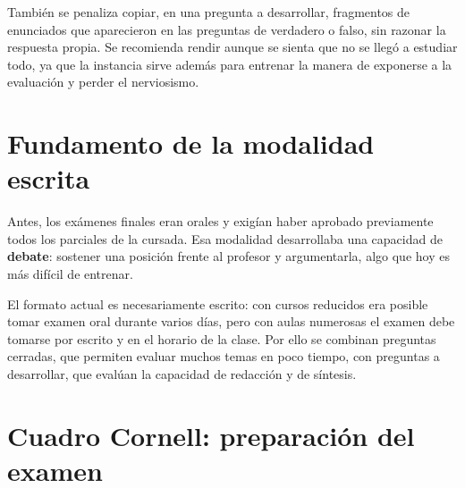 \documentclass[12pt,oneside]{book}
\begin{document}
También se penaliza copiar, en una pregunta a desarrollar, fragmentos de enunciados que aparecieron en las preguntas de verdadero o falso, sin razonar la respuesta propia. Se recomienda rendir aunque se sienta que no se llegó a estudiar todo, ya que la instancia sirve además para entrenar la manera de exponerse a la evaluación y perder el nerviosismo.

\section{Fundamento de la modalidad escrita}

Antes, los exámenes finales eran orales y exigían haber aprobado previamente todos los parciales de la cursada. Esa modalidad desarrollaba una capacidad de \textbf{debate}: sostener una posición frente al profesor y argumentarla, algo que hoy es más difícil de entrenar.

El formato actual es necesariamente escrito: con cursos reducidos era posible tomar examen oral durante varios días, pero con aulas numerosas el examen debe tomarse por escrito y en el horario de la clase. Por ello se combinan preguntas cerradas, que permiten evaluar muchos temas en poco tiempo, con preguntas a desarrollar, que evalúan la capacidad de redacción y de síntesis.

\section{Cuadro Cornell: preparación del examen}
\end{document}
